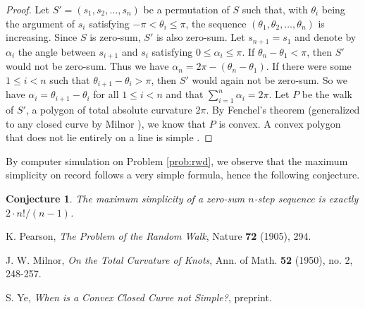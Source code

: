 \documentclass{amsart}
\newtheorem{conjecture}[proposition]{Conjecture}
\theoremstyle{definition}
\theoremstyle{problem}
\theoremstyle{remark}
\begin{document}
\begin{proof}
    Let $S'=(s_1,s_2,\dots,s_n)$ be a permutation of $S$ such that, with
    $\theta_i$ being the argument of $s_i$ satisfying $-\pi<\theta_i\le\pi$,
    the sequence $(\theta_1,\theta_2,\dots,\theta_n)$ is increasing.
    Since $S$ is zero-sum, $S'$ is also zero-sum.
    Let $s_{n+1}=s_1$ and denote by $\alpha_i$ the angle between
    $s_{i+1}$ and $s_i$ satisfying $0\le\alpha_i\le\pi$.
    If $\theta_n-\theta_1<\pi$, then $S'$ would not be zero-sum.
    Thus we have $\alpha_n=2\pi-(\theta_n-\theta_1)$.
    If there were some $1\le i<n$ such that $\theta_{i+1}-\theta_{i}>\pi$,
    then $S'$ would again not be zero-sum. So we have $\alpha_i=\theta_{i+1}-\theta_i$
    for all $1\le i<n$ and that $\sum_{i=1}^n\alpha_i=2\pi$.
    Let $P$ be the walk of $S'$, a polygon of total absolute curvature $2\pi$.
    By Fenchel's theorem (generalized to any closed curve by Milnor
    \cite[Theorem 3.4]{milnor}), we know that $P$ is convex.
    A convex polygon that does not lie entirely on a line is simple \cite{ye}.
\end{proof}

By computer simulation on Problem \ref{prob:rwd}, we observe that the maximum
simplicity on record follows a very simple formula, hence the following conjecture.

\begin{conjecture}
    \label{conj:value_formula}
    The maximum simplicity of a zero-sum $n$-step sequence
    is exactly $2\cdot n!/(n-1)$.
\end{conjecture}

\begin{thebibliography}{9}

    K. Pearson,
    \emph{The Problem of the Random Walk},
    Nature \textbf{72} (1905), 294.

    J. W. Milnor,
    \emph{On the Total Curvature of Knots},
    Ann. of Math.
    \textbf{52} (1950), no. 2, 248-257.

    S. Ye,
    \emph{When is a Convex Closed Curve not Simple?},
    preprint.

\end{thebibliography}
\end{document}

